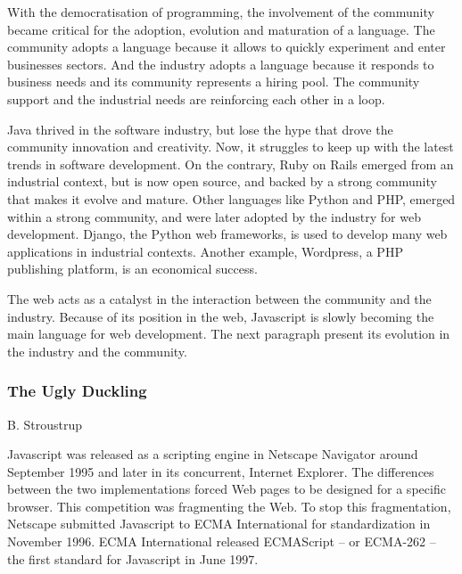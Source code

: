 With the democratisation of programming, the involvement of the community became critical for the adoption, evolution and maturation of a language.
The community adopts a language because it allows to quickly experiment and enter businesses sectors.
And the industry adopts a language because it responds to business needs and its community represents a hiring pool.
The community support and the industrial needs are reinforcing each other in a loop.

Java thrived in the software industry, but lose the hype that drove the community innovation and creativity.
Now, it struggles to keep up with the latest trends in software development.
On the contrary, Ruby on Rails emerged from an industrial context, but is now open source, and backed by a strong community that makes it evolve and mature.
Other languages like Python and PHP, emerged within a strong community, and were later adopted by the industry for web development.
Django, the Python web frameworks, is used to develop many web applications in industrial contexts.
Another example, Wordpress, a PHP publishing platform, is an economical success.

The web acts as a catalyst in the interaction between the community and the industry.
Because of its position in the web, Javascript is slowly becoming the main language for web development.
The next paragraph present its evolution in the industry and the community.

\subsubsection{The Ugly Duckling}


%
{B. Stroustrup}


Javascript was released as a scripting engine in Netscape Navigator around September 1995 and later in its concurrent, Internet Explorer.
The differences between the two implementations forced Web pages to be designed for a specific browser.
This competition was fragmenting the Web.
To stop this fragmentation, Netscape submitted Javascript to ECMA International for standardization in November 1996.
ECMA International released  ECMAScript -- or ECMA-262 -- the first standard for Javascript in June 1997. %

